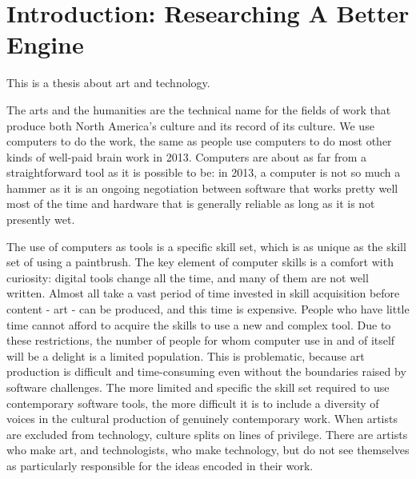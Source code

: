 
\chapter{Introduction: Researching A Better Engine} %

\label{Chapter1} %



This is a thesis about art and technology. 

The arts and the humanities are the technical name for the fields of work that produce both North America’s culture and its record of its culture. We use computers to do the work, the same as people use computers to do most other kinds of well-paid brain work in 2013. Computers are about as far from a straightforward tool as it is possible to be: in 2013, a computer is not so much a hammer as it is an ongoing negotiation between software that works pretty well most of the time and hardware that is generally reliable as long as it is not presently wet.

The use of computers as tools is a specific skill set, which is as unique as the skill set of using a paintbrush. The key element of computer skills is a comfort with curiosity: digital tools change all the time, and many of them are not well written. Almost all take a vast period of time invested in skill acquisition before content - art - can be produced, and this time is expensive. People who have little time cannot afford to acquire the skills to use a new and complex tool. Due to these restrictions, the number of people for whom computer use in and of itself will be a delight is a limited population. This is problematic, because art production is difficult and time-consuming even without the boundaries raised by software challenges. The more limited and specific the skill set required to use contemporary software tools, the more difficult it is to include a diversity of voices in the cultural production of genuinely contemporary work. When artists are excluded from technology, culture splits on lines of privilege. There are artists who make art, and technologists, who make technology, but do not see themselves as particularly responsible for the ideas encoded in their work. 

